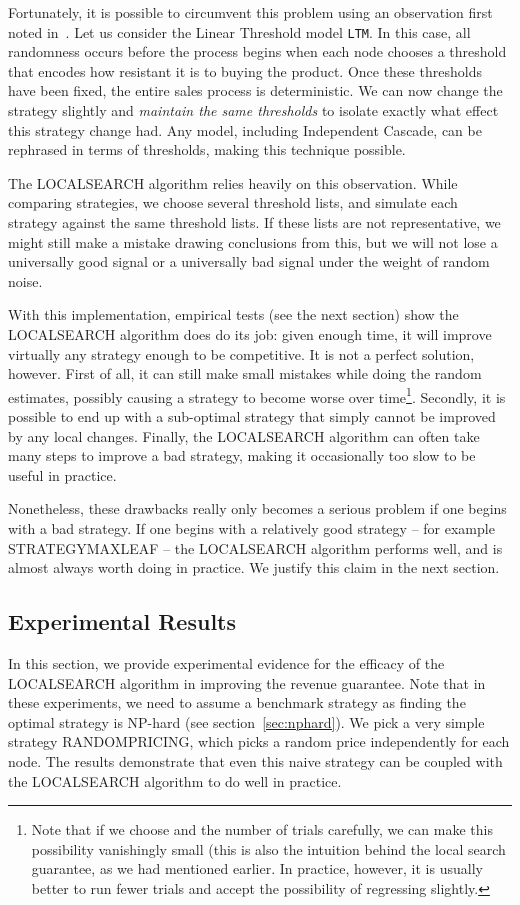 \documentclass[letterpaper,twoside]{article}
\newcommand{\LTM}[1]{\texttt{LTM}}
\newcommand{\strategyml}{\textrm{S{\scriptsize TRATEGY}\-M{\scriptsize AX}\-L{\scriptsize EAF}}}
\newcommand{\LS}{\textrm{L{\scriptsize OCAL}\-S{\scriptsize EARCH}}}
\newcommand{\rand}{\textrm{R{\scriptsize ANDOM}\-P{\scriptsize RICING}}}
\begin{document}
Fortunately, it is possible to circumvent this problem using an observation
first noted in~\cite{KKT03}. Let us consider the
Linear Threshold model \LTM{B}. In this case, all randomness occurs before
the process begins when each node chooses a threshold that encodes how
resistant it is to buying the product. Once these thresholds have been fixed,
the entire sales process is deterministic. We can now change the strategy
slightly and {\em maintain the same thresholds} to isolate exactly what
effect this strategy change had. Any model, including Independent Cascade,
can be rephrased in terms of thresholds, making this technique possible.

The \LS{} algorithm relies heavily on this observation. While comparing
strategies, we choose several threshold lists, and simulate each strategy
against the same threshold lists.  If these lists are not representative, we
might still make a mistake drawing conclusions from this, but we will not
lose a universally good signal or a universally bad signal under the weight
of random noise.

With this implementation, empirical tests (see the next section) show the
\LS{} algorithm does do its job: given enough time, it will improve virtually
any strategy enough to be competitive.  It is not a perfect solution,
however. First of all, it can still make small mistakes while doing the
random estimates, possibly causing a strategy to become worse over
time\footnote{Note that if we choose  and the number of trials
  carefully, we can make this possibility vanishingly small (this is also the
  intuition behind the local search guarantee, as we had mentioned
  earlier. In practice, however, it is usually better to run fewer trials and
  accept the possibility of regressing slightly.}.  Secondly, it is possible
to end up with a sub-optimal strategy that simply cannot be improved by any
local changes. Finally, the \LS{} algorithm can often take many steps to
improve a bad strategy, making it occasionally too slow to be useful in
practice.

Nonetheless, these drawbacks really only becomes a serious problem if one
begins with a bad strategy.  If one begins with a relatively good strategy --
for example \strategyml{} -- the \LS{} algorithm performs well, and is almost
always worth doing in practice. We justify this claim in the next section.

\subsection{Experimental Results}
In this section, we provide experimental evidence for the efficacy of the
\LS{} algorithm in improving the revenue guarantee. Note that in these
experiments, we need to assume a benchmark strategy as finding the optimal
strategy is NP-hard (see section~\ref{sec:nphard}). We pick a very simple
strategy \rand, which picks a random price independently for each node. The
results demonstrate that even this naive strategy can be coupled with the
\LS{} algorithm to do well in practice.
\end{document}
